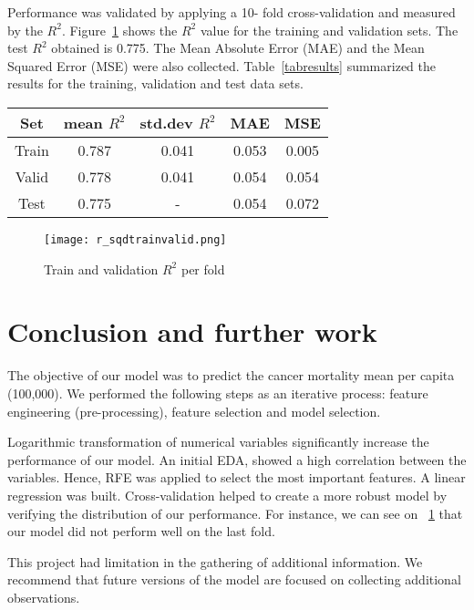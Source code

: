 \documentclass[twocolumn]{article}
\begin{document}
Performance was validated by applying a 10- fold cross-validation and measured by the $R^2$. Figure~\ref{fig:rsqrd_trainval} shows the $R^2$ value for the training and validation sets. The test $R^2$ obtained is 0.775. The Mean Absolute Error (MAE) and the Mean Squared Error (MSE) were also collected. Table~\ref{tabresults} summarized the results for the training, validation and test data sets.

\begin{center}\label{tabresults}
\begin{tabular}{ |c|c|c|c|c| } 
 \hline
 Set   &mean $R^2$ &std.dev $R^2$   & MAE   & MSE \\
 \hline
 Train      &0.787      & 0.041                     &0.053  &0.005 \\ 
 Valid &0.778      &0.041                      &0.054  & 0.054\\ 
 Test       & 0.775     &-                          &0.054  & 0.072\\ 
 \hline
\end{tabular}
\end{center}

\begin{figure}
    \centering
    \texttt{[image: r\_sqdtrainvalid.png]}
    \caption{Train and validation $R^2$ per fold}
    \label{fig:rsqrd_trainval}
\end{figure}

\section{Conclusion and further work}\label{secconclusion}

The objective of our model was to predict the cancer mortality mean per capita (100,000). We performed the following steps as an iterative process: feature engineering (pre-processing), feature selection and model selection. 

Logarithmic transformation of numerical variables significantly increase the performance of our model. An initial EDA, showed a high correlation between the variables. Hence, RFE was applied to select the most important features. A linear regression was built. Cross-validation helped to create a more robust model by verifying the distribution of our performance. For instance, we can see on ~\ref{fig:rsqrd_trainval} that our model did not perform well on the last fold. 

This project had limitation in the gathering of additional information. We recommend that future versions of the model are focused on collecting additional observations.
\end{document}
